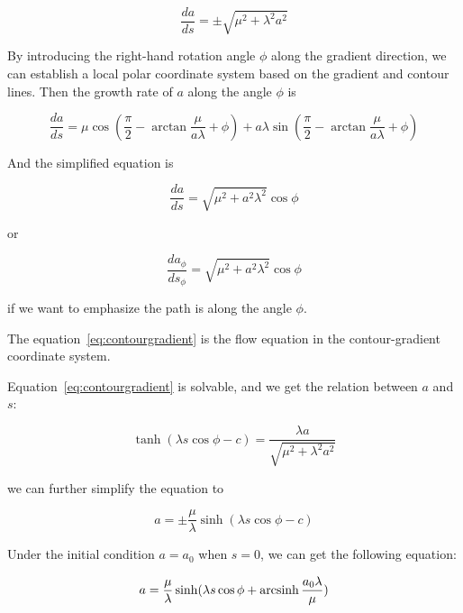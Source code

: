 \begin{equation}
    \frac{da}{ds} = \pm \sqrt{\mu^2 + \lambda^2 a^2}\label{eq:grad}
\end{equation}

By introducing the right-hand rotation angle $\phi$ along the gradient direction, we can establish a local polar coordinate system based on the gradient and contour lines.
Then the growth rate of $a$ along the angle $\phi$ is

\begin{equation}
    \frac{da}{ds} = \mu \cos (\frac{\pi}{2} - \arctan \frac{\mu}{a \lambda} + \phi) + a \lambda \sin (\frac{\pi}{2} - \arctan \frac{\mu}{a \lambda} + \phi)
    \label{eq:fourfold}
\end{equation}

And the simplified equation is

\begin{equation}
    \frac{da}{ds} = \sqrt {\mu^2 + a^2 \lambda^2} \cos \phi\label{eq:contourgradient}
\end{equation}

or

\begin{equation}
    \frac{da_{\phi}}{ds_{\phi}} = \sqrt {\mu^2 + a^2 \lambda^2} \cos \phi\label{eq:contourgradient2}
\end{equation}

if we want to emphasize the path is along the angle $\phi$.

The equation~\eqref{eq:contourgradient} is the flow equation in the contour-gradient coordinate system.

Equation~\eqref{eq:contourgradient} is solvable, and we get the relation between $a$ and $s$:

\begin{equation}\label{eq:rel_a_s}
    \tanh(\lambda s \cos \phi - c) = \frac{\lambda a}{\sqrt{\mu^2 + \lambda^2 a^2}}
\end{equation}

we can further simplify the equation to

\begin{equation}
  a = \pm \frac{\mu}{\lambda} \sinh(\lambda s \cos \phi - c)\label{eq:gradevo}
\end{equation}

Under the initial condition $a = a_0$ when $s = 0$, we can get the following equation:

\begin{equation}
    a = \frac{\mu}{\lambda} \sinh(\lambda s \cos \phi + \operatorname{arcsinh} \frac{a_0 \lambda}{\mu})\label{eq:gradevo2}
\end{equation}

